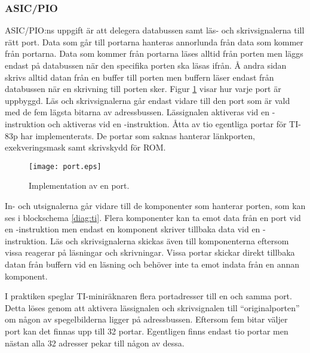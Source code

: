 \documentclass[main.tex]{subfiles}
\begin{document}
\subsubsection{ASIC/PIO}
ASIC/PIO:ns uppgift är att delegera databussen samt läs- och skrivsignalerna
till rätt port. Data som går till portarna hanteras annorlunda från data som
kommer från portarna. Data som kommer från portarna läses alltid från porten
men läggs endast på databussen när den specifika porten ska läsas ifrån. Å
andra sidan skrivs alltid datan från en buffer till porten men buffern läser
endast från databussen när en skrivning till porten sker. Figur \ref{fig:port}
visar hur varje port är uppbyggd. Läs och skrivsignalerna går endast vidare
till den port som är vald med de fem lägsta bitarna av adressbussen.
Lässignalen  aktiveras vid en -instruktion och 
aktiveras vid en -instruktion. Åtta av tio egentliga portar för
TI-83p har implementerats. De portar som saknas hanterar länkporten,
exekveringsmask samt skrivskydd för ROM.

\begin{figure}[H]
    \center
    \texttt{[image: port.eps]}
    \caption{Implementation av en port.}
    \label{fig:port}
\end{figure}

In- och utsignalerna går vidare till de komponenter som hanterar porten, som
kan ses i blockschema \ref{diag:ti}. Flera komponenter kan ta emot data från en
port vid en -instruktion men endast en komponent skriver tillbaka
data vid en -instruktion. Läs och skrivsignalerna skickas även till
komponenterna eftersom vissa reagerar på läsningar och skrivningar. Vissa
portar skickar direkt tillbaka datan från buffern vid en läsning och behöver
inte ta emot indata från en annan komponent.

I praktiken speglar TI-miniräknaren flera portadresser till en och samma port.
Detta löses genom att aktivera lässignalen och skrivsignalen till
``originalporten'' om någon av spegelbilderna ligger på adressbussen. Eftersom
fem bitar väljer port kan det finnas upp till 32 portar. Egentligen finns
endast tio portar men nästan alla 32 adresser pekar till någon av dessa.
\end{document}
